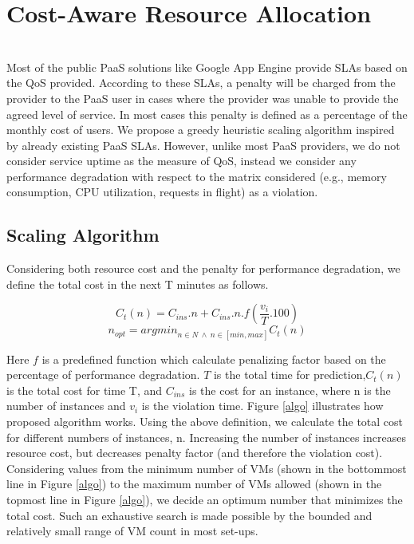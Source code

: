 \section{Cost-Aware Resource Allocation}\\
Most of the public PaaS solutions like Google App Engine provide SLAs based on the QoS provided. According to these SLAs, a penalty will be charged from the provider to the PaaS user in cases where the provider was unable to provide the agreed level of service. In most cases this penalty is defined as a percentage of the monthly cost of users. We propose a greedy heuristic scaling algorithm inspired by already existing PaaS SLAs. However, unlike most PaaS providers, we do not consider service uptime as the measure of QoS, instead we consider any performance degradation with respect to the matrix considered (e.g., memory consumption, CPU utilization, requests in flight) as a violation.\\

\subsection{Scaling Algorithm}
Considering both resource cost and the penalty for performance degradation, we define the total cost in the next T minutes as follows.

\textbf{$$ C_t(n) = C_{ins}.n  + C_{ins} . n . f(\frac{v_i}{T}.100) $$}
\textbf{$$n_{opt} = argmin_{n \in N \ \land \ n \in [min, max]}C_t(n)$$} 


Here $f$ is a predefined function which calculate penalizing factor based on the percentage of performance degradation. $T$ is the total time for prediction,$C_t(n)$ is the total cost for time T, and $C_{ins}$ is the cost for an instance, where n is the number of instances and $v_i$ is the violation time. Figure \ref{algo} illustrates how proposed algorithm works. Using the above definition, we calculate the total cost for different numbers of instances, n. Increasing the number of instances increases resource cost, but decreases penalty factor (and therefore the violation cost). Considering values from the minimum number of VMs (shown in the bottommost line in Figure \ref{algo}) to the maximum number of VMs allowed (shown in the topmost line in Figure \ref{algo}), we decide an optimum number that minimizes the total cost. Such an exhaustive search is made possible by the bounded and relatively small range of VM count in most set-ups.